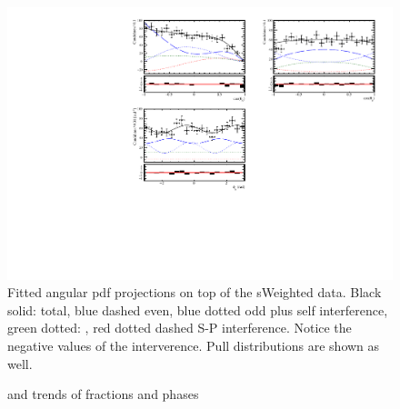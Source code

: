 \begin{figure}[h]
\begin{center}
  \includegraphics[width=\textwidth]{Figures/Chapter4/canv_Bs_allKaons_3fb_mergeAccPer_allKpiBins_AcpZero_Pw_split}
  \caption{Fitted angular pdf projections on top of the \BsJpsiKst sWeighted data. 
           Black solid: total, blue dashed \pwave even, blue dotted \pwave odd plus \pwave self interference, 
           green dotted: \swave, red dotted dashed S-P interference. Notice the negative values of the \spwave interverence.
           Pull distributions are shown as well.}
  \label{angular_plot}
\end{center}
\end{figure}

\begin{figure}[h]
  \centering
  \begin{subfigure}{0.5\textwidth}
    \scalebox{0.60}{}
    \caption{}
    \label{skase}
  \end{subfigure}%
  \hfill%
  \begin{subfigure}{0.5\textwidth}
    \scalebox{0.60}{}
    \caption{}
    \label{opasd}
  \end{subfigure}
  \begin{subfigure}{0.5\textwidth}
    \scalebox{0.60}{}
    \caption{}
    \label{opa}
  \end{subfigure}%
\caption{\pwave and \swave trends of \BsJpsiKst \BdJpsiKst fractions and phases}
\end{figure}

